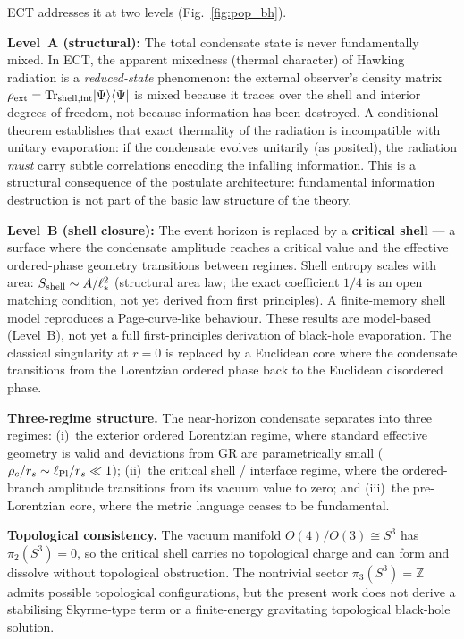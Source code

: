 \documentclass[11pt,a4paper]{article}
\begin{document}
ECT addresses it at two levels (Fig.~\ref{fig:pop_bh}).

\textbf{Level~A (structural):} The total condensate state is never fundamentally mixed. In ECT, the apparent mixedness (thermal character) of Hawking radiation is a \emph{reduced-state} phenomenon: the external observer's density matrix $\rho_{\rm ext} = {\rm Tr}_{\rm shell,int}|\Psi\rangle\langle\Psi|$ is mixed because it traces over the shell and interior degrees of freedom, not because information has been destroyed. A conditional theorem establishes that exact thermality of the radiation is incompatible with unitary evaporation: if the condensate evolves unitarily (as posited), the radiation \emph{must} carry subtle correlations encoding the infalling information. This is a structural consequence of the postulate architecture: fundamental information destruction is not part of the basic law structure of the theory.

\textbf{Level~B (shell closure):} The event horizon is replaced by a \textbf{critical shell} --- a surface where the condensate amplitude reaches a critical value and the effective ordered-phase geometry transitions between regimes. Shell entropy scales with area: $S_{\rm shell} \sim A/\ell_*^2$ (structural area law; the exact coefficient $1/4$ is an open matching condition, not yet derived from first principles). A finite-memory shell model reproduces a Page-curve-like behaviour. These results are model-based (Level~B), not yet a full first-principles derivation of black-hole evaporation. The classical singularity at $r=0$ is replaced by a Euclidean core where the condensate transitions from the Lorentzian ordered phase back to the Euclidean disordered phase.



\textbf{Three-regime structure.}
The near-horizon condensate separates into three regimes:
(i)~the exterior ordered Lorentzian regime, where standard effective geometry is valid and deviations from GR are parametrically small ($\rho_c/r_s \sim \ell_{\rm Pl}/r_s \ll 1$);
(ii)~the critical shell / interface regime, where the ordered-branch amplitude transitions from its vacuum value to zero;
and (iii)~the pre-Lorentzian core, where the metric language ceases to be fundamental.

\textbf{Topological consistency.}
The vacuum manifold $O(4)/O(3) \cong S^3$ has $\pi_2(S^3) = 0$, so the critical shell carries no topological charge and can form and dissolve without topological obstruction.
The nontrivial sector $\pi_3(S^3) = \mathbb{Z}$ admits possible topological configurations, but the present work does not derive a stabilising Skyrme-type term or a finite-energy gravitating topological black-hole solution.
\end{document}
